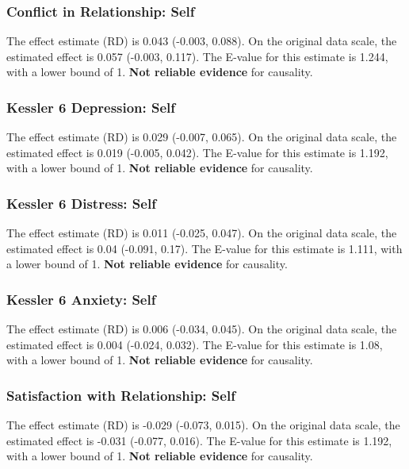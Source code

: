 \documentclass[
  singlecolumn]{article}
\begin{document}
\subsubsection{Conflict in Relationship:
Self}\label{conflict-in-relationship-self}

The effect estimate (RD) is 0.043 (-0.003, 0.088). On the original data
scale, the estimated effect is 0.057 (-0.003, 0.117). The E-value for
this estimate is 1.244, with a lower bound of 1. \textbf{Not reliable
evidence} for causality.

\subsubsection{Kessler 6 Depression:
Self}\label{kessler-6-depression-self}

The effect estimate (RD) is 0.029 (-0.007, 0.065). On the original data
scale, the estimated effect is 0.019 (-0.005, 0.042). The E-value for
this estimate is 1.192, with a lower bound of 1. \textbf{Not reliable
evidence} for causality.

\subsubsection{Kessler 6 Distress: Self}\label{kessler-6-distress-self}

The effect estimate (RD) is 0.011 (-0.025, 0.047). On the original data
scale, the estimated effect is 0.04 (-0.091, 0.17). The E-value for this
estimate is 1.111, with a lower bound of 1. \textbf{Not reliable
evidence} for causality.

\subsubsection{Kessler 6 Anxiety: Self}\label{kessler-6-anxiety-self}

The effect estimate (RD) is 0.006 (-0.034, 0.045). On the original data
scale, the estimated effect is 0.004 (-0.024, 0.032). The E-value for
this estimate is 1.08, with a lower bound of 1. \textbf{Not reliable
evidence} for causality.

\subsubsection{Satisfaction with Relationship:
Self}\label{satisfaction-with-relationship-self}

The effect estimate (RD) is -0.029 (-0.073, 0.015). On the original data
scale, the estimated effect is -0.031 (-0.077, 0.016). The E-value for
this estimate is 1.192, with a lower bound of 1. \textbf{Not reliable
evidence} for causality.
\end{document}
